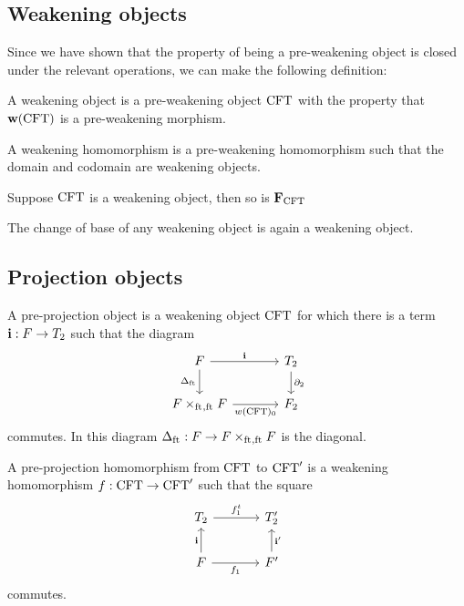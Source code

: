 \subsection{Weakening objects}
Since we have shown that the property of being a pre-weakening object is closed
under the relevant operations, we can make the following definition:

\begin{defn}
A weakening object is a pre-weakening object $\mathrm{CFT}$ with the property that
$\mathbf{w}(\mathrm{CFT})$ is a pre-weakening morphism.
\end{defn}

\begin{defn}
A weakening homomorphism is a pre-weakening homomorphism such that the domain
and codomain are weakening objects.
\end{defn}

\begin{thm}
Suppose $\mathrm{CFT}$ is a weakening object, then so is $\mathbf{F}_{\mathrm{CFT}}$
\end{thm}

\begin{thm}
The change of base of any weakening object is again a weakening object.
\end{thm}

\subsection{Projection objects}
\begin{defn}
A pre-projection object is a weakening object $\mathrm{CFT}$ for which there is a term
$\mathbf{i}:F\to T_2$ such that the diagram
\begin{equation*}
\begin{tikzcd}[column sep=large]
\stesysf \ar{r}{\mathbf{i}} \ar{d}[swap]{\Delta_{\eft}} & \stesyst_2 \ar{d}{\ebd[2]}\\
\pullback{\stesysf}{\stesysf}{\eft}{\eft} \ar{r}[swap]{w(\stesys)_0} & \stesysf_2
\end{tikzcd}
\end{equation*}
commutes. In this diagram $\Delta_{\eft}:\stesysf\to \pullback{\stesysf}{\stesysf}{\eft}{\eft}$ is the diagonal.
\end{defn}

\begin{defn}
A pre-projection homomorphism from $\mathrm{CFT}$ to $\mathrm{CFT}'$ is a weakening homomorphism
$f:\mathrm{CFT}\to \mathrm{CFT}'$ such that the square
\begin{equation*}
\begin{tikzcd}[column sep=large]
\stesyst_2
  \ar{r}{f^t_1}
  &
\stesyst_2'
  \\
\stesysf \ar{r}[swap]{f_1}
  \ar{u}{\mathbf{i}}
  &
\stesysf'
  \ar{u}[swap]{\mathbf{i}'}
\end{tikzcd}
\end{equation*}
commutes.
\end{defn}

